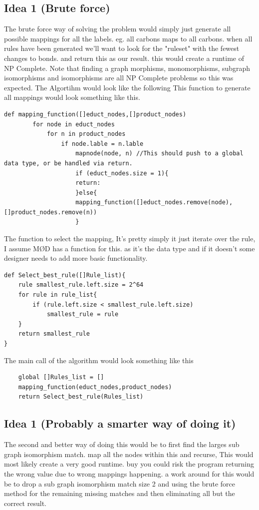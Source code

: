 \documentclass[a4paper,10pt,titlepage]{report}
\begin{document}
\subsection{Idea 1 (Brute force)}
The brute force way of solving the problem would simply just generate all possible mappings for all the labels. eg. all carbons maps to all carbons. when all rules have been generated we'll want to look for the "ruleset" with the fewest changes to bonds. and return this as our result. this would create a runtime of NP Complete. Note that finding a graph morphisms, monomorphisms, subgraph isomorphisms and isomorphisms are all NP Complete problems so this was expected.  
The Algortihm would look like the following
This function to generate all mappings would look something like this.
\begin{lstlisting}
def mapping_function([]educt_nodes,[]product_nodes)
        for node in educt_nodes
            for n in product_nodes
                if node.lable = n.lable
                    mapnode(node, n) //This should push to a global data type, or be handled via return.
                    if (educt_nodes.size = 1){
                    return:
                    }else{
                    mapping_function([]educt_nodes.remove(node),[]product_nodes.remove(n))
                    }
\end{lstlisting}
The function to select the mapping, It's pretty simply it just iterate over the rule, I assume MØD has a function for this. as it's the data type and if it doesn't some designer needs to add more basic functionality.
\begin{lstlisting}
def Select_best_rule([]Rule_list){
    rule smallest_rule.left.size = 2^64
    for rule in rule_list{
        if (rule.left.size < smallest_rule.left.size)
            smallest_rule = rule
    }    
    return smallest_rule
}
\end{lstlisting}
The main call of the algorithm would look something like this
\begin{lstlisting}
    global []Rules_list = []
    mapping_function(educt_nodes,product_nodes)
    return Select_best_rule(Rules_list)
\end{lstlisting}
        
\subsection{Idea 1 (Probably a smarter way of doing it)}
The second and better way of doing this would be to first find the larges sub graph isomorphism match. map all the nodes within this and recurse, This would most likely create a very good runtime. buy you could risk the program returning the wrong value due to wrong mappings happening. a work around for this would be to drop a sub graph isomorphism match size 2 and using the brute force method for the remaining missing matches and then eliminating all but the correct result.
\end{document}

